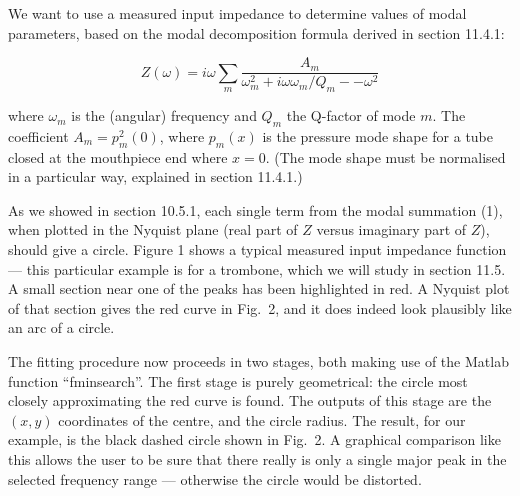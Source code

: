  We want to use a measured input impedance to determine values of modal 
  parameters, based on the modal decomposition formula derived in section 
  11.4.1: 

  $$Z(\omega) = i \omega \sum_m{\dfrac{A_m}{\omega_m^2+ i \omega \omega_m/Q_m 
  -- \omega^2}} \tag{1}$$ 

  where $\omega_m$ is the (angular) frequency and $Q_m$ the Q-factor of mode 
  $m$. The coefficient $A_m = p_m^2(0)$, where $p_m(x)$ is the pressure mode 
  shape for a tube closed at the mouthpiece end where $x=0$. (The mode shape 
  must be normalised in a particular way, explained in section 11.4.1.) 

  As we showed in section 10.5.1, each single term from the modal summation 
  (1), when plotted in the Nyquist plane (real part of $Z$ versus imaginary 
  part of $Z$), should give a circle. Figure 1 shows a typical measured input 
  impedance function — this particular example is for a trombone, which we will 
  study in section 11.5. A small section near one of the peaks has been 
  highlighted in red. A Nyquist plot of that section gives the red curve in 
  Fig.\ 2, and it does indeed look plausibly like an arc of a circle. 



  The fitting procedure now proceeds in two stages, both making use of the 
  Matlab function “fminsearch”. The first stage is purely geometrical: the 
  circle most closely approximating the red curve is found. The outputs of this 
  stage are the $(x,y)$ coordinates of the centre, and the circle radius. The 
  result, for our example, is the black dashed circle shown in Fig.\ 2. A 
  graphical comparison like this allows the user to be sure that there really 
  is only a single major peak in the selected frequency range — otherwise the 
  circle would be distorted. 

